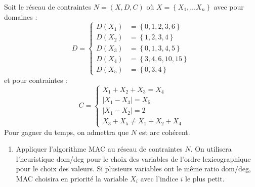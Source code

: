 \begin{td-exo}
    Soit le réseau de contraintes \(N = (X, D, C)\) où \(X = \left\{ X_1,\ldots X_n\right\}\) avec pour domaines :
    \begin{equation*}
        D = 
        \begin{cases}
            D(X_1) &= \left\{0, 1, 2, 3, 6\right\} \\
            D(X_2) &= \left\{1, 2, 3, 4\right\} \\
            D(X_3) &= \left\{0, 1, 3, 4, 5\right\} \\
            D(X_4) &= \left\{3, 4, 6, 10, 15\right\} \\
            D(X_5) &= \left\{0, 3, 4\right\}
        \end{cases}
    \end{equation*}
    et pour contraintes :
    \begin{equation*}
        C = 
        \begin{cases}
            X_1 + X_2 + X_3 = X_4 \\
            |X_1 - X_3| = X_5 \\
            |X_1 - X_2| = 2 \\
            X_3 + X_5 \neq X_1 + X_2 + X_4
        \end{cases}
    \end{equation*}
    Pour gagner du temps, on admettra que \(N\) est arc cohérent.
    \begin{enumerate}
        \item Appliquer l'algorithme MAC au réseau de contraintes \(N\).
        On utilisera l'heuristique dom/deg pour le choix des variables de l'ordre lexicographique pour le choix des valeurs.
        Si plusieurs variables ont le m\^eme ratio dom/deg, MAC choisira en priorité la variable \(X_i\) avec l'indice \(i\) le plus petit.
    \end{enumerate}
\end{td-exo}


